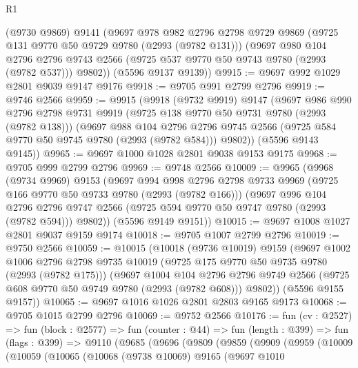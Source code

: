 \begin{lexlean}{R1}
\begin{coremodule}
      (@9730 @9869)
      @9141
      (@9697
        @978
        @982
        @2796
        @2798
        @9729
        @9869
        (@9725 @131 @9770 @50 @9729 @9780 (@2993 (@9782 @131)))
        (@9697
          @980
          @104
          @2796
          @2796
          @9743
          @2566
          (@9725 @537 @9770 @50 @9743 @9780 (@2993 (@9782 @537)))
          @9802))
      (@5596 @9137 @9139))
@9915 := @9697 @992 @1029 @2801 @9039 @9147 @9176
@9918 := @9705 @991 @2799 @2796
@9919 := @9746 @2566
@9959 := @9915
    (@9918
      (@9732 @9919)
      @9147
      (@9697
        @986
        @990
        @2796
        @2798
        @9731
        @9919
        (@9725 @138 @9770 @50 @9731 @9780 (@2993 (@9782 @138)))
        (@9697
          @988
          @104
          @2796
          @2796
          @9745
          @2566
          (@9725 @584 @9770 @50 @9745 @9780 (@2993 (@9782 @584)))
          @9802))
      (@5596 @9143 @9145))
@9965 := @9697 @1000 @1028 @2801 @9038 @9153 @9175
@9968 := @9705 @999 @2799 @2796
@9969 := @9748 @2566
@10009 := @9965
    (@9968
      (@9734 @9969)
      @9153
      (@9697
        @994
        @998
        @2796
        @2798
        @9733
        @9969
        (@9725 @166 @9770 @50 @9733 @9780 (@2993 (@9782 @166)))
        (@9697
          @996
          @104
          @2796
          @2796
          @9747
          @2566
          (@9725 @594 @9770 @50 @9747 @9780 (@2993 (@9782 @594)))
          @9802))
      (@5596 @9149 @9151))
@10015 := @9697 @1008 @1027 @2801 @9037 @9159 @9174
@10018 := @9705 @1007 @2799 @2796
@10019 := @9750 @2566
@10059 := @10015
    (@10018
      (@9736 @10019)
      @9159
      (@9697
        @1002
        @1006
        @2796
        @2798
        @9735
        @10019
        (@9725 @175 @9770 @50 @9735 @9780 (@2993 (@9782 @175)))
        (@9697
          @1004
          @104
          @2796
          @2796
          @9749
          @2566
          (@9725 @608 @9770 @50 @9749 @9780 (@2993 (@9782 @608)))
          @9802))
      (@5596 @9155 @9157))
@10065 := @9697 @1016 @1026 @2801 @2803 @9165 @9173
@10068 := @9705 @1015 @2799 @2796
@10069 := @9752 @2566
@10176 := fun (cv : @2527) =>
  fun (block : @2577) =>
  fun (counter : @44) =>
  fun (length : @399) =>
  fun (flags : @399) =>
  @9110
    (@9685
      (@9696
        (@9809
          (@9859
            (@9909
              (@9959
                (@10009
                  (@10059
                    (@10065
                      (@10068
                        (@9738 @10069)
                        @9165
                        (@9697
                          @1010

\end{coremodule}
\end{lexlean}
